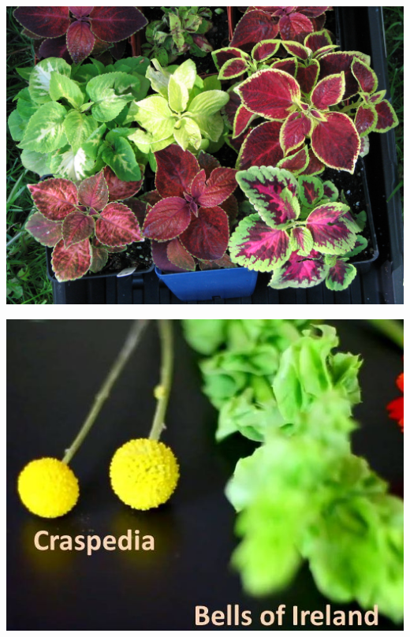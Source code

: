 \documentclass{article}
\begin{document}
\begin{center}
\includegraphics[height=0.9\textheight, angle=90]{../Coleus_hybrids.jpg}
\end{center}
\newpage

\begin{center}
\includegraphics[height=0.9\textheight, angle=90]{../Craspedia-BellsOfIreland.jpg}
\end{center}
\newpage
\end{document}
